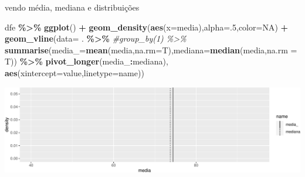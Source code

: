 \documentclass[
  9pt,
  ignorenonframetext,
  aspectratio=169]{beamer}
\newenvironment{Shaded}{\begin{snugshade}}{\end{snugshade}}
\newcommand{\CommentTok}[1]{\textcolor[rgb]{0.56,0.35,0.01}{\textit{#1}}}
\newcommand{\DataTypeTok}[1]{\textcolor[rgb]{0.13,0.29,0.53}{#1}}
\newcommand{\DecValTok}[1]{\textcolor[rgb]{0.00,0.00,0.81}{#1}}
\newcommand{\KeywordTok}[1]{\textcolor[rgb]{0.13,0.29,0.53}{\textbf{#1}}}
\newcommand{\NormalTok}[1]{#1}
\newcommand{\OperatorTok}[1]{\textcolor[rgb]{0.81,0.36,0.00}{\textbf{#1}}}
\newcommand{\OtherTok}[1]{\textcolor[rgb]{0.56,0.35,0.01}{#1}}
\newcommand{\StringTok}[1]{\textcolor[rgb]{0.31,0.60,0.02}{#1}}
\begin{document}
\begin{frame}[fragile]{vendo média, mediana e distribuições}
\protect\hypertarget{vendo-muxe9dia-mediana-e-distribuiuxe7uxf5es}{}
\begin{Shaded}
\begin{Highlighting}[]
\NormalTok{dfe }\OperatorTok{\%\textgreater{}\%}\StringTok{ }\KeywordTok{ggplot}\NormalTok{() }\OperatorTok{+}
\StringTok{  }\KeywordTok{geom\_density}\NormalTok{(}\KeywordTok{aes}\NormalTok{(}\DataTypeTok{x=}\NormalTok{media),}\DataTypeTok{alpha=}\NormalTok{.}\DecValTok{5}\NormalTok{,}\DataTypeTok{color=}\OtherTok{NA}\NormalTok{) }\OperatorTok{+}
\StringTok{  }\KeywordTok{geom\_vline}\NormalTok{(}\DataTypeTok{data=}\NormalTok{ . }\OperatorTok{\%\textgreater{}\%}\StringTok{ }\CommentTok{\#group\_by(1) \%\textgreater{}\%}
\StringTok{               }\KeywordTok{summarise}\NormalTok{(}\DataTypeTok{media\_=}\KeywordTok{mean}\NormalTok{(media,}\DataTypeTok{na.rm=}\NormalTok{T),}\DataTypeTok{mediana=}\KeywordTok{median}\NormalTok{(media,}\DataTypeTok{na.rm =}\NormalTok{ T)) }\OperatorTok{\%\textgreater{}\%}
\StringTok{               }\KeywordTok{pivot\_longer}\NormalTok{(media\_}\OperatorTok{:}\NormalTok{mediana),}
             \KeywordTok{aes}\NormalTok{(}\DataTypeTok{xintercept=}\NormalTok{value,}\DataTypeTok{linetype=}\NormalTok{name))}
\end{Highlighting}
\end{Shaded}

\includegraphics{aula_08_files/figure-beamer/unnamed-chunk-10-1.pdf}
\end{frame}
\end{document}
